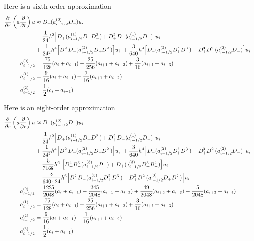 \documentclass[10pt]{article}
\begin{document}
Here is a sixth-order approximation
\begin{align*}
 {\partial \over \partial r}\left( a {\partial \over \partial r}\right) u &\approx
     D_+( a_{i-1/2}^{(0)} D_-) u_i \\
     & - {1\over 24} h^2\Big[ D_+( a_{i-1/2}^{(1)} D_+D_-^2) + D_+^2D_-( a_{i-1/2}^{(1)} D_-) \Big] u_i \\
     & + {1\over 24^2} h^4 \Big[ D_+^2D_-( a_{i-1/2}^{(2)} D_+D_-^2) \Big] u_i
         ~+ {3\over 640} h^4\Big[ D_+( a_{i-1/2}^{(2)} D_+^2D_-^3) + D_+^3D_-^2( a_{i-1/2}^{(2)} D_-) \Big] u_i \\
   a_{i-1/2}^{(0)} &= {75\over128} ( a_{i} + a_{i-1} ) -{25\over256} ( a_{i+1} + a_{i-2} )
                                                 +{3\over16} ( a_{i+2} + a_{i-3} )  \\
   a_{i-1/2}^{(1)} &={9\over16} ( a_{i} + a_{i-1} ) -{1\over16} ( a_{i+1} + a_{i-2} ) \\
   a_{i-1/2}^{(2)} &= {1\over2} ( a_{i} + a_{i-1} )
\end{align*} 

Here is an eight-order approximation
\begin{align*}
 {\partial \over \partial r}\left( a {\partial \over \partial r}\right) u &\approx
D_+( a_{i-1/2}^{(0)} D_-) u_i \\
     & - {1\over 24} h^2\Big[ D_+( a_{i-1/2}^{(1)} D_+D_-^2) + D_+^2D_-( a_{i-1/2}^{(1)} D_-) \Big] u_i \\
     & + {1\over 24^2} h^4 \Big[ D_+^2D_-( a_{i-1/2}^{(2)} D_+D_-^2) \Big] u_i
         ~+ {3\over 640} h^4\Big[ D_+( a_{i-1/2}^{(2)} D_+^2D_-^3) + D_+^3D_-^2( a_{i-1/2}^{(2)} D_-) \Big] u_i \\
     & -{5 \over 7168} h^6~ \Big[ D_+^4D_-^3( a_{i-1/2}^{(3)} D_- ) + D_+( a_{i-1/2}^{(3)} D_+^3D_-^4) \Big] u_i \\
     & -{3\over 640\cdot24} h^6\Big[ D_+^2D_-( a_{i-1/2}^{(3)} D_+^2D_-^3) 
                + D_+^3D_-^2( a_{i-1/2}^{(3)} D_+D_-^2)  \Big] u_i \\
   a_{i-1/2}^{(0)} &= {1225\over2048} ( a_{i} + a_{i-1} ) -{245\over2048} ( a_{i+1} + a_{i-2} )
                 +{49\over2048} ( a_{i+2} + a_{i-3} ) -{5\over2048} ( a_{i+3} + a_{i-4} ) \\
   a_{i-1/2}^{(1)} &= {75\over128} ( a_{i} + a_{i-1} ) -{25\over256} ( a_{i+1} + a_{i-2} )
                                                 +{3\over16} ( a_{i+2} + a_{i-3} )  \\
   a_{i-1/2}^{(2)} &={9\over16} ( a_{i} + a_{i-1} ) -{1\over16} ( a_{i+1} + a_{i-2} ) \\
   a_{i-1/2}^{(3)} &= {1\over2} ( a_{i} + a_{i-1} )
\end{align*} 
\end{document}
